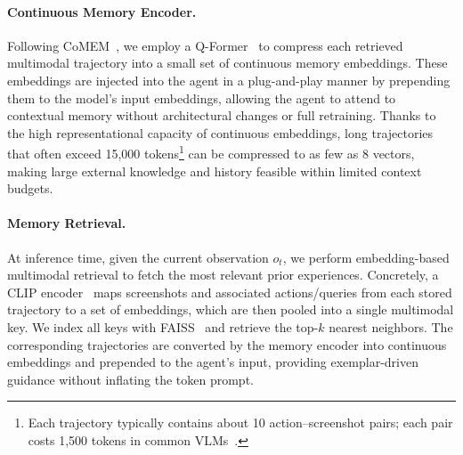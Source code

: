 \documentclass{article} %
\begin{document}
\paragraph{Continuous Memory Encoder.}
Following CoMEM~\citep{wu2025}, we employ a Q-Former~\citep{qformer} to compress each retrieved multimodal trajectory into a small set of continuous memory embeddings. These embeddings are injected into the agent in a plug-and-play manner by prepending them to the model’s input embeddings, allowing the agent to attend to contextual memory without architectural changes or full retraining. Thanks to the high representational capacity of continuous embeddings, long trajectories that often exceed 15,000 tokens\footnote{Each trajectory typically contains about 10 action–screenshot pairs; each pair costs 1,500 tokens in common VLMs~\citep{zheng2024seeact_multimodal_mind2web}.} can be compressed to as few as 8 vectors, making large external knowledge and history feasible within limited context budgets.

\paragraph{Memory Retrieval.}
At inference time, given the current observation $o_t$, we perform embedding-based multimodal retrieval to fetch the most relevant prior experiences. Concretely, a CLIP encoder~\citep{radford2021learning} maps screenshots and associated actions/queries from each stored trajectory to a set of embeddings, which are then pooled into a single multimodal key. We index all keys with FAISS~\citep{douze2024faiss} and retrieve the top-$k$ nearest neighbors. The corresponding trajectories are converted by the memory encoder into continuous embeddings and prepended to the agent’s input, providing exemplar-driven guidance without inflating the token prompt.

\end{document}
